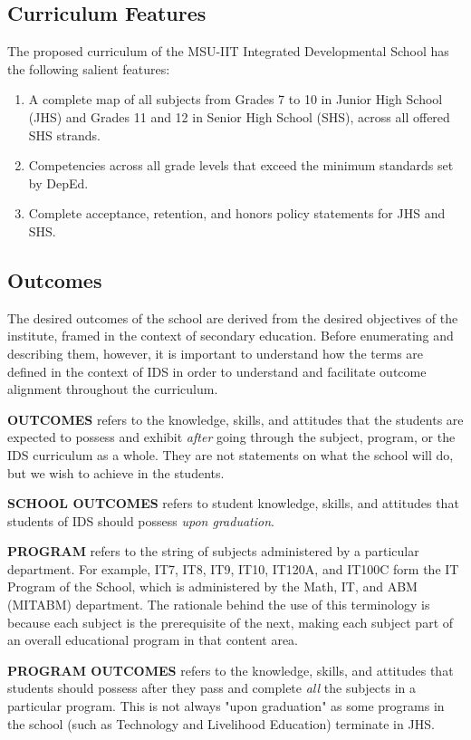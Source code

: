 \subsection{Curriculum Features}
The proposed curriculum of the MSU-IIT Integrated Developmental School has the following salient features:
\begin{enumerate}
	\item{A complete map of all subjects from Grades 7 to 10 in Junior High School (JHS) and Grades 11 and 12 in Senior High School (SHS), across all offered SHS strands.}
	\item{Competencies across all grade levels that exceed the minimum standards set by DepEd.}
	\item{Complete acceptance, retention, and honors policy statements for JHS and SHS.}
\end{enumerate}



\subsection{Outcomes}
The desired outcomes of the school are derived from the desired objectives of the institute, framed in the context of secondary education. Before enumerating and describing them, however, it is important to understand how the terms are defined in the context of IDS in order to understand and facilitate outcome alignment throughout the curriculum.

\textbf{OUTCOMES} refers to the knowledge, skills, and attitudes that the students are expected to possess and exhibit \textit{after} going through the subject, program, or the IDS curriculum as a whole. They are not statements on what the school will do, but we wish to achieve in the students.

\textbf{SCHOOL OUTCOMES} refers to student knowledge, skills, and attitudes that students of IDS should possess \textit{upon graduation}.

\textbf{PROGRAM} refers to the string of subjects administered by a particular department. For example, IT7, IT8, IT9, IT10, IT120A, and IT100C form the IT Program of the School, which is administered by the Math, IT, and ABM (MITABM) department. The rationale behind the use of this terminology is because each subject is the prerequisite of the next, making each subject part of an overall educational program in that content area.

\textbf{PROGRAM OUTCOMES} refers to the knowledge, skills, and attitudes that students should possess after they pass and complete \textit{all} the subjects in a particular program. This is not always "upon graduation" as some programs in the school (such as Technology and Livelihood Education) terminate in JHS.

